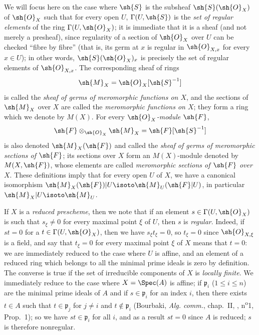 \begin{env}[20.1.3]
\label{IV.20.1.3}
We will focus here on the case where $\sh{S}$ is the subsheaf $\sh{S}(\sh{O}_X)$ of $\sh{O}_X$ such that for every open $U$, $\Gamma(U,\sh{S})$ is the \emph{set of regular elements} of the ring $\Gamma(U,\sh{O}_X)$;
it is immediate that it is a sheaf (and not merely a presheaf), since regularity of a section of $\sh{O}_X$ over $U$ can be checked ``fibre by fibre'' (that is, its germ at $x$ is regular in $\sh{O}_{X,x}$ for every $x\in U$); in other words, $\sh{S}(\sh{O}_X)_x$ is precisely the set of regular elements of $\sh{O}_{X,x}$.
The corresponding sheaf of rings
\[
  \sh{M}_X=\sh{O}_X[\sh{S}^{-1}]
\]
is called the \emph{sheaf of germs of meromorphic functions on $X$}, and the sections of $\sh{M}_X$ over $X$ are called the \emph{meromorphic functions on $X$};
they form a ring which we denote by $M(X)$.
For every \emph{$\sh{O}_X$-module $\sh{F}$},
\[
  \sh{F}\otimes_{\sh{O}_X}\sh{M}_X=\sh{F}[\sh{S}^{-1}]
\]
is also denoted $\sh{M}_X(\sh{F})$ and called the \emph{sheaf of germs of meromorphic sections of $\sh{F}$};
its sections over $X$ form an $M(X)$-module denoted by $M(X,\sh{F})$, whose elements are called \emph{meromorphic sections of $\sh{F}$ over $X$}.
These definitions imply that for every open $U$ of $X$, we have a canonical isomorphism $\sh{M}_X(\sh{F})|U\isoto\sh{M}_U(\sh{F}|U)$, in particular $\sh{M}_X|U\isoto\sh{M}_U$.
\end{env}

\begin{env}[20.1.3.1]
\label{IV.20.1.3.1}
If $X$ is a \emph{reduced prescheme}, then we note that if an element $s\in\Gamma(U,\sh{O}_X)$ is such that $s_\xi\neq 0$ for every maximal point $\xi$ of $U$, then $s$ is \emph{regular}.
Indeed, if $st=0$ for a $t\in\Gamma(U,\sh{O}_X)$, then we have $s_\xi t_\xi=0$, so $t_\xi=0$ since $\sh{O}_{X,\xi}$ is a field, and say that $t_\xi=0$ for every maximal point $\xi$ of $X$ means that $t=0$:
we are immediately reduced to the case where $U$ is affine, and an element of a reduced ring which belongs to all the minimal prime ideals is zero by definition.
The converse is true if the set of irreducible components of $X$ is \emph{locally finite}.
We immediately reduce to the case where $X=\Spec(A)$ is affine;
if $\mathfrak{p}_i$ ($1\leq i\leq n$) are the minimal prime ideals of $A$ and if $s\in\mathfrak{p}_i$ for an index $i$, then there exists $t\in A$ such that $t\in\mathfrak{p}_j$ for $j\neq i$ and $t\not\in\mathfrak{p}_i$ (Bourbaki, \emph{Alg. comm.}, chap.~II, , n\textsuperscript{o}1, Prop.~1);
so we have $st\in\mathfrak{p}_i$ for all $i$, and as a result $st=0$ since $A$ is reduced;
$s$ is therefore nonregular.
\end{env}

